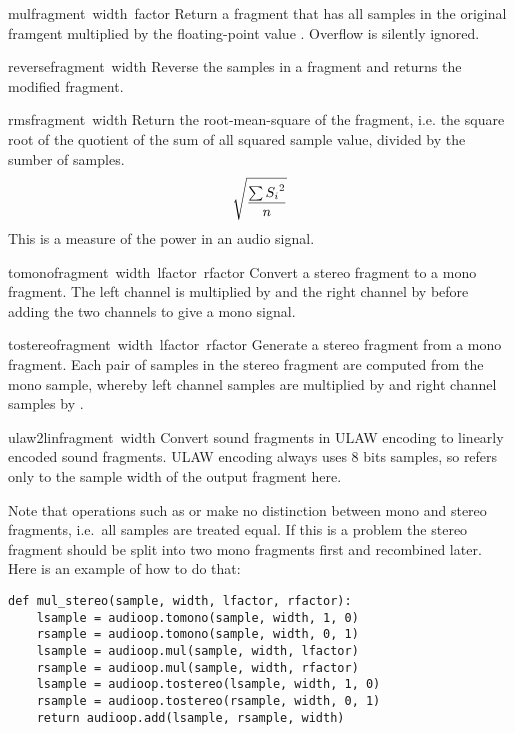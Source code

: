 \begin{funcdesc}{mul}{fragment\, width\, factor}
Return a fragment that has all samples in the original framgent
multiplied by the floating-point value .  Overflow is
silently ignored.
\end{funcdesc}

\begin{funcdesc}{reverse}{fragment\, width}
Reverse the samples in a fragment and returns the modified fragment.
\end{funcdesc}

\begin{funcdesc}{rms}{fragment\, width}
Return the root-mean-square of the fragment, i.e.
\iftexi
the square root of the quotient of the sum of all squared sample value,
divided by the sumber of samples.
\else
\begin{displaymath}
\catcode`_=8
\sqrt{\frac{\sum{{S_{i}}^{2}}}{n}}
\end{displaymath}
\fi
This is a measure of the power in an audio signal.
\end{funcdesc}

\begin{funcdesc}{tomono}{fragment\, width\, lfactor\, rfactor} 
Convert a stereo fragment to a mono fragment.  The left channel is
multiplied by  and the right channel by 
before adding the two channels to give a mono signal.
\end{funcdesc}

\begin{funcdesc}{tostereo}{fragment\, width\, lfactor\, rfactor}
Generate a stereo fragment from a mono fragment.  Each pair of samples
in the stereo fragment are computed from the mono sample, whereby left
channel samples are multiplied by  and right channel
samples by .
\end{funcdesc}

\begin{funcdesc}{ulaw2lin}{fragment\, width}
Convert sound fragments in ULAW encoding to linearly encoded sound
fragments.  ULAW encoding always uses 8 bits samples, so 
refers only to the sample width of the output fragment here.
\end{funcdesc}

Note that operations such as  or  make no
distinction between mono and stereo fragments, i.e.\ all samples are
treated equal.  If this is a problem the stereo fragment should be split
into two mono fragments first and recombined later.  Here is an example
of how to do that:
\bcode\begin{verbatim}
def mul_stereo(sample, width, lfactor, rfactor):
    lsample = audioop.tomono(sample, width, 1, 0)
    rsample = audioop.tomono(sample, width, 0, 1)
    lsample = audioop.mul(sample, width, lfactor)
    rsample = audioop.mul(sample, width, rfactor)
    lsample = audioop.tostereo(lsample, width, 1, 0)
    rsample = audioop.tostereo(rsample, width, 0, 1)
    return audioop.add(lsample, rsample, width)
\end{verbatim}\ecode

